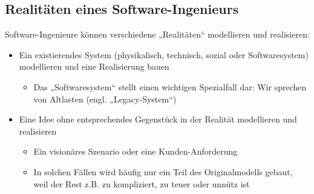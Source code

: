 \subsection{Realitäten eines Software-Ingenieurs}
Software-Ingenieure können verschiedene „Realitäten“ modellieren und realisieren:
\begin{itemize}
    \item Ein existierendes System (physikalisch, technisch, sozial oder Softwaresystem) modellieren und eine Realisierung bauen
    \begin{itemize}
        \item Das „Softwaresystem“ stellt einen wichtigen Spezialfall dar: Wir sprechen von Altlasten (engl. „Legacy-System“)
    \end{itemize}
    \item Eine Idee ohne entsprechendes Gegenstück in der Realität modellieren und realisieren
    \begin{itemize}
        \item Ein visionäres Szenario oder eine Kunden-Anforderung
        \item In solchen Fällen wird häufig nur ein Teil des Originalmodells gebaut, weil der Rest z.B. zu kompliziert, zu teuer oder unnütz ist
    \end{itemize}
\end{itemize}